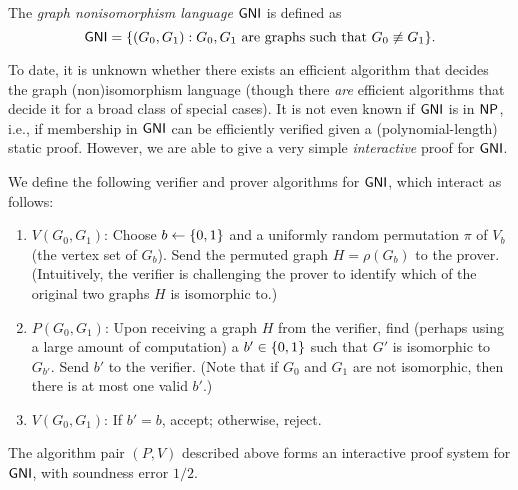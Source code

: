 \documentclass[11pt]{article}
\begin{document}
\begin{definition}
  \label{def:gni}
  The \emph{graph nonisomorphism language} $\mathsf{GNI}$ is defined as \[
  \mathsf{GNI} = \{(G_{0}, G_{1}) : G_{0}, G_{1} \text{ are graphs such
      that } G_{0} \not\equiv G_{1}\}. \]
\end{definition}

To date, it is unknown whether there exists an efficient algorithm
that decides the graph (non)isomorphism language (though there
\emph{are} efficient algorithms that decide it for a broad class of
special cases).  It is not even known if $\mathsf{GNI}$ is in $\mathsf{NP}$, i.e., if
membership in $\mathsf{GNI}$ can be efficiently verified given a
(polynomial-length) static proof.  However, we are able to give a very
simple \emph{interactive} proof for $\mathsf{GNI}$.

\begin{protocol}
  We define the following verifier and prover algorithms for $\mathsf{GNI}$,
  which interact as follows:
  \begin{enumerate}
  \item $V(G_{0}, G_{1})$: Choose $b \gets \{0,1\}$ and a uniformly
    random permutation $\pi$ of $V_{b}$ (the vertex set of $G_{b}$).
    Send the permuted graph $H = \rho(G_{b})$ to the prover.
    (Intuitively, the verifier is challenging the prover to identify
    which of the original two graphs $H$ is isomorphic to.)
  \item $P(G_{0}, G_{1})$: Upon receiving a graph $H$ from the
    verifier, find (perhaps using a large amount of computation) a $b'
    \in \{0,1\}$ such that $G'$ is isomorphic to $G_{b'}$.  Send $b'$ to
    the verifier.  (Note that if $G_{0}$ and $G_{1}$ are not
    isomorphic, then there is at most one valid $b'$.)
  \item $V(G_{0}, G_{1})$: If $b' = b$, accept; otherwise, reject.
  \end{enumerate}
\end{protocol}

\begin{theorem}
  The algorithm pair $(P,V)$ described above forms an interactive
  proof system for $\mathsf{GNI}$, with soundness error $1/2$.
\end{theorem}
\end{document}
